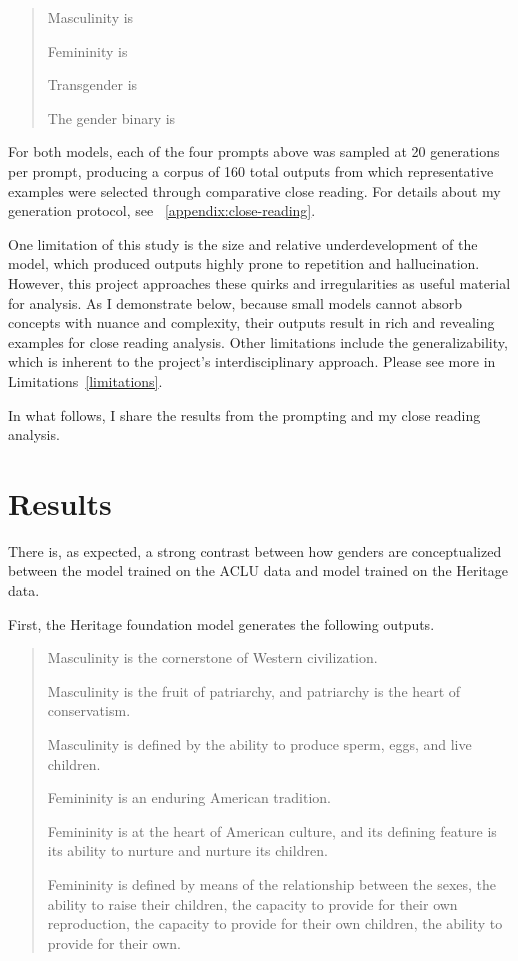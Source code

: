 \documentclass[anonymous,review]{acmart}
\begin{document}
\begin{quote}
Masculinity is

Femininity is

Transgender is

The gender binary is
\end{quote}

For both models, each of the four prompts above was sampled at 20 generations per prompt, producing a corpus of 160 total outputs from which representative examples were selected through comparative close reading. For details about my generation protocol, see ~\autoref{appendix:close-reading}.

One limitation of this study is the size and relative underdevelopment of the model, which produced outputs highly prone to repetition and hallucination. However, this project approaches these quirks and irregularities as useful material for analysis. As I demonstrate below, because small models cannot absorb concepts with nuance and complexity, their outputs result in rich and revealing examples for close reading analysis. Other limitations include the generalizability, which is inherent to the project's interdisciplinary approach. Please see more in  Limitations~\autoref{limitations}.

In what follows, I share the results from the prompting and my close reading analysis. 


\section{Results}

There is, as expected, a strong contrast between how genders are conceptualized between the model trained on the ACLU data and model trained on the Heritage data. 

First, the Heritage foundation model generates the following outputs. 

\begin{quote}
Masculinity is the cornerstone of Western civilization.

Masculinity is the fruit of patriarchy, and patriarchy is the heart
of conservatism.

Masculinity is defined by the ability to produce sperm, eggs, and live
children.

Femininity is an enduring American tradition.

Femininity is at the heart of American culture, and its defining feature is its ability to nurture and nurture its children.

Femininity is defined by means of the relationship between the sexes,
the ability to raise their children, the capacity to provide for their
own reproduction, the capacity to provide for their own children, the
ability to provide for their own.
\end{quote}
\end{document}
